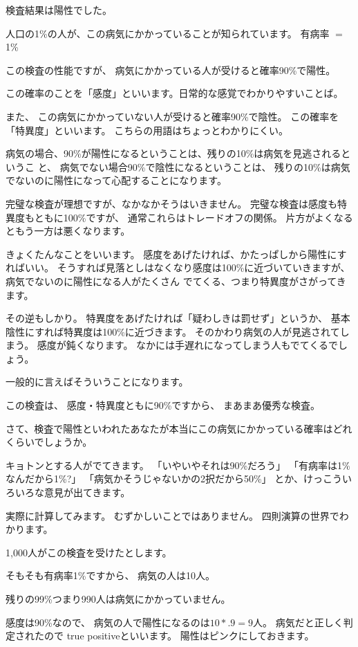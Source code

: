 \documentclass[uplatex,jis2004,dvipdfmx,12pt]{jsarticle}
\begin{document}
検査結果は陽性でした。

人口の1\%の人が、この病気にかかっていることが知られています。
有病率 $=$ 1\%

この検査の性能ですが、
病気にかかっている人が受けると確率90\%で陽性。

この確率のことを「感度」といいます。日常的な感覚でわかりやすいことば。

また、
この病気にかかっていない人が受けると確率90\%で陰性。
この確率を「特異度」といいます。
こちらの用語はちょっとわかりにくい。

病気の場合、90\%が陽性になるということは、残りの10\%は病気を見逃されるというこ
と、
病気でない場合90\%で陰性になるということは、
残りの10\%は病気でないのに陽性になって心配することになります。

完璧な検査が理想ですが、なかなかそうはいきません。
完璧な検査は感度も特異度もともに100\%ですが、
通常これらはトレードオフの関係。
片方がよくなるともう一方は悪くなります。

きょくたんなことをいいます。
感度をあげたければ、かたっぱしから陽性にすればいい。
そうすれば見落としはなくなり感度は100\%に近づいていきますが、
病気でないのに陽性になる人がたくさん
でてくる、つまり特異度がさがってきます。

その逆もしかり。
特異度をあげたければ「疑わしきは罰せず」というか、
基本陰性にすれば特異度は100\%に近づきます。
そのかわり病気の人が見逃されてしまう。
感度が鈍くなります。
なかには手遅れになってしまう人もでてくるでしょう。

一般的に言えばそういうことになります。

この検査は、
感度・特異度ともに90\%ですから、
まあまあ優秀な検査。


さて、検査で陽性といわれたあなたが本当にこの病気にかかっている確率はどれくらいでしょうか。

キョトンとする人がでてきます。
「いやいやそれは90\%だろう」
「有病率は1\%なんだから1\%?」
「病気かそうじゃないかの2択だから50\%」
とか、けっこういろいろな意見が出てきます。

実際に計算してみます。
むずかしいことではありません。
四則演算の世界でわかります。

1,000人がこの検査を受けたとします。

そもそも有病率1\%ですから、
病気の人は10人。

残りの99\%つまり990人は病気にかかっていません。

感度は90\%なので、
病気の人で陽性になるのは$10*.9=9$人。
病気だと正しく判定されたので
true positiveといいます。
陽性はピンクにしておきます。
\end{document}
